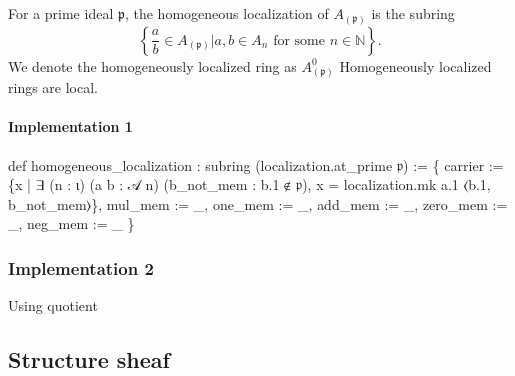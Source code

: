 \documentclass[11pt]{article}
\newenvironment{Shaded}{}{}
\newcommand{\NormalTok}[1]{{#1}}
\begin{document}
For a prime ideal \(\mathfrak p\), the homogeneous localization of
\(A_{(\mathfrak p)}\) is the subring \[
\left\{\frac a b\in A_{(\mathfrak p)}\left|\text{$a, b\in A_n$ for some $n\in\mathbb N$}\right.\right\}.
\] We denote the homogeneously localized ring as \(A^0_{(\mathfrak p)}\)
Homogeneously localized rings are local.

    \hypertarget{implementation-1}{%
\paragraph{Implementation 1}\label{implementation-1}}

\begin{Shaded}
\begin{Highlighting}[]
\NormalTok{def homogeneous\_localization : subring (localization.at\_prime 𝔭) :=}
\NormalTok{\{ carrier := \{x | ∃ (n : ι) (a b : 𝒜 n) (b\_not\_mem : b.1 ∉ 𝔭), }
\NormalTok{    x = localization.mk a.1 ⟨b.1, b\_not\_mem⟩\},}
\NormalTok{  mul\_mem\textquotesingle{} := \_,}
\NormalTok{  one\_mem\textquotesingle{} := \_,}
\NormalTok{  add\_mem\textquotesingle{} := \_,}
\NormalTok{  zero\_mem\textquotesingle{} := \_,}
\NormalTok{  neg\_mem\textquotesingle{} := \_ \}}
\end{Highlighting}
\end{Shaded}

    \hypertarget{implementation-2}{%
\subsubsection{Implementation 2}\label{implementation-2}}

Using quotient

\begin{Shaded}
\end{Shaded}

    \hypertarget{structure-sheaf}{%
\subsection{Structure sheaf}\label{structure-sheaf}}
\end{document}
